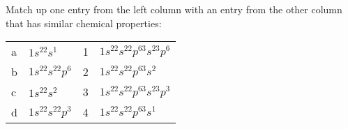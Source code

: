 \documentclass[10pt]{exam}
\begin{document}
\begin{questions}
\question Match up one entry from the left column with an entry from the other
  column that has similar chemical properties:

\begin{tabular}{|l|l|l|l|}

a& $1s^22s^1$ & 1& $1s^22s^22p^63s^23p^6$ \\
b& $1s^22s^22p^6$ & 2& $1s^22s^22p^63s^2$ \\
c& $1s^22s^2$ & 3& $1s^22s^22p^63s^23p^3$ \\
d& $1s^22s^22p^3$ & 4&$1s^22s^22p^63s^1$  
\end{tabular}

\end{questions}
\end{document}
